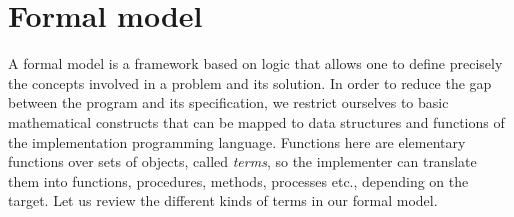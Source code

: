 
\section{Formal model}
\label{model}

A formal model is a framework based on logic that allows one to define
precisely the concepts involved in a problem and its solution. In
order to reduce the gap between the program and its specification, we
restrict ourselves to basic mathematical constructs that can be mapped
to data structures and functions of the implementation programming
language. Functions here are elementary functions over sets of
objects, called \emph{terms}, so the implementer can translate them
into functions, procedures, methods, processes etc., depending on the
target. Let us review the different kinds of terms in our formal
model.
